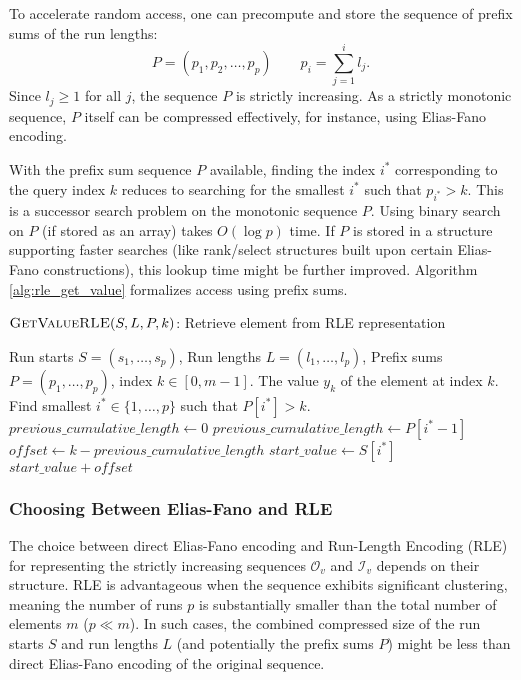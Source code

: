 To accelerate random access, one can precompute and store the sequence of prefix sums of the run lengths:
\[ P = (p_1, p_2, \dots, p_p) \qquad  p_i = \sum_{j=1}^{i} l_j. \]
Since $l_j \ge 1$ for all $j$, the sequence $P$ is strictly increasing. As a strictly monotonic sequence, $P$ itself can be compressed effectively, for instance, using Elias-Fano encoding.

With the prefix sum sequence $P$ available, finding the index $i^*$ corresponding to the query index $k$ reduces to searching for the smallest $i^*$ such that $p_{i^*} > k$. This is a successor search problem on the monotonic sequence $P$. Using binary search on $P$ (if stored as an array) takes $O(\log p)$ time. If $P$ is stored in a structure supporting faster searches (like rank/select structures built upon certain Elias-Fano constructions), this lookup time might be further improved. Algorithm \ref{alg:rle_get_value} formalizes access using prefix sums.

\begin{algorithm}[htbp]
    \caption{$\textsc{GetValueRLE}(S, L, P, k)$: Retrieve element from RLE representation} %
    \label{alg:rle_get_value}
    \small
    \begin{algorithmic}[1]
        \Require Run starts $S=(s_1,\dots,s_p)$, Run lengths $L=(l_1,\dots,l_p)$, Prefix sums $P=(p_1, \dots, p_p)$, index $k \in [0, m-1]$.
        \Ensure The value $y_k$ of the element at index $k$.
        \State Find smallest $i^* \in \{1, \dots, p\}$ such that $P[i^*] > k$.
        \State $previous\_cumulative\_length \leftarrow 0$
        \Else
        \State $previous\_cumulative\_length \leftarrow P[i^*-1]$
        \EndIf
        \State $offset \leftarrow k - previous\_cumulative\_length$
        \State $start\_value \leftarrow S[i^*]$
        \State \Return $start\_value + offset$
    \end{algorithmic}
\end{algorithm}

\subsubsection*{Choosing Between Elias-Fano and RLE}
The choice between direct Elias-Fano encoding and Run-Length Encoding (RLE) for representing the strictly increasing sequences $\mathcal{O}_v$ and $\mathcal{I}_v$ depends on their structure. RLE is advantageous when the sequence exhibits significant clustering, meaning the number of runs $p$ is substantially smaller than the total number of elements $m$ ($p \ll m$). In such cases, the combined compressed size of the run starts $S$ and run lengths $L$ (and potentially the prefix sums $P$) might be less than direct Elias-Fano encoding of the original sequence.

